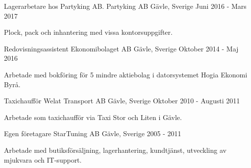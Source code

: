 

\begin{cventries}

  \cventry
    {Lagerarbetare hos Partyking AB.} %
    {Partyking AB} %
    {Gävle, Sverige} %
    {Juni 2016 - Mars 2017} %
    {
      \begin{cvitems} %
        \item {Plock, pack och inhantering med vissa kontorsuppgifter.}
      \end{cvitems}
    }

  \cventry
    {Redovisningsassistent} %
    {Ekonomibolaget AB} %
    {Gävle, Sverige} %
    {Oktober 2014 - Maj 2016} %
    {
      \begin{cvitems} %
        \item {Arbetade med bokföring för 5 mindre aktiebolag i datorsystemet Hogia Ekonomi Byrå.}
      \end{cvitems}
    }

  \cventry
    {Taxichaufför} %
    {Welat Transport AB} %
    {Gävle, Sverige} %
    {Oktober 2010 - Augusti 2011} %
    {
      \begin{cvitems} %
        \item {Arbetade som taxichaufför via Taxi Stor och Liten i Gävle.}
      \end{cvitems}
    }

  \cventry
    {Egen företagare} %
    {StarTuning AB} %
    {Gävle, Sverige} %
    {2005 - 2011} %
    {
      \begin{cvitems} %
        \item {Arbetade med butiksförsäljning, lagerhantering, kundtjänst, utveckling av mjukvara och IT-support.}
      \end{cvitems}
    }

\end{cventries}
